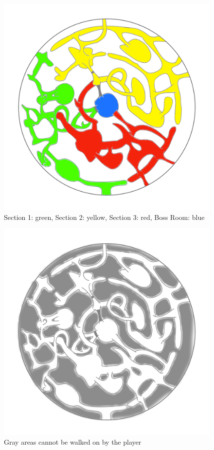 \begin{figure}[H]
	\centering
	\includegraphics[width=0.7\linewidth]{images/map/map_all_sections.png}
	\caption*{Section 1: green, Section 2: yellow, Section 3: red, Boss Room: blue}
\end{figure}

\begin{figure}[H]
	\centering
	\includegraphics[width=0.9\linewidth]{images/map/2D_map_not.png}
	\caption*{Gray areas cannot be walked on by the player}
\end{figure}
\newpage

